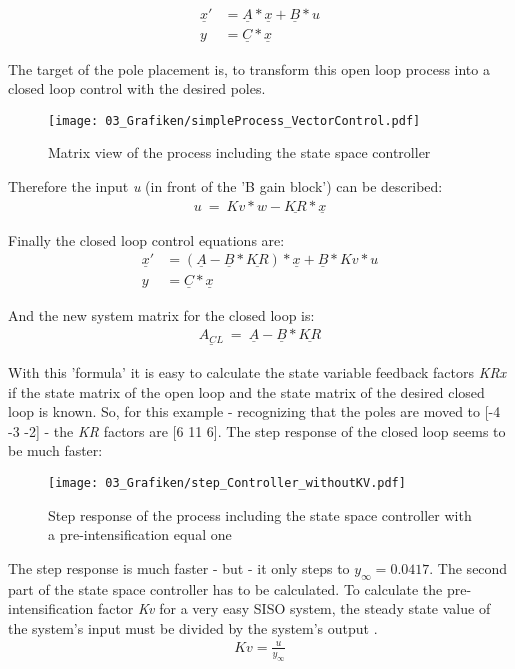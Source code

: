 \begin{align}
	\underline{x}' & = \underline{A} * \underline{x} + \underline{B} * u \\
	y  & = \underline{C} * \underline{x}
\end{align}

The target of the pole placement is, to transform this open loop process into a closed loop control with the desired poles.

\begin{figure}
	\centering
		\texttt{[image: 03\_Grafiken/simpleProcess\_VectorControl.pdf]}
	\caption{Matrix view of the process including the state space controller}
	\label{fig:simpleProcess_VectorControl}
\end{figure}

Therefore the input \textit{u} (in front of the 'B gain block') can be described:
\begin{align}
	u ~=~ Kv*w - \underline{KR}*\underline{x} 
\end{align}

Finally the closed loop control equations are:
\begin{align}
	\underline{x}' & = (\underline{A} - \underline{B} * \underline{KR}) * \underline{x} + \underline{B} * Kv * u \\
	y  & = \underline{C} * \underline{x}
\end{align}

And the new system matrix for the closed loop is:
\begin{align}
	\underline{A_{CL}} ~=~ \underline{A} - \underline{B} *\underline{KR} 
\end{align}

With this 'formula' it is easy to calculate the state variable feedback factors \textit{KRx} if the state matrix of the open loop and the state matrix of the desired closed loop is known. 
So, for this example - recognizing that the poles are moved to [-4 -3 -2] - the \textit{KR} factors are [6 11 6]. The step response of the closed loop seems to be much faster:

\begin{figure}
	\centering
		\texttt{[image: 03\_Grafiken/step\_Controller\_withoutKV.pdf]}
	\caption{Step response of the process including the state space controller with a pre-intensification equal one}
	\label{fig:stepControlKV1}
\end{figure}

The step response is much faster - but - it only steps to $y_\infty = 0.0417$. The second part of the state space controller has to be calculated. To calculate the pre-intensification factor \textit{Kv} for a very easy SISO system, the steady state value of the system's input must be divided by the system's output . 
\begin{align}\label{Kveasy}
	Kv = \frac{u}{y_\infty}
\end{align}

